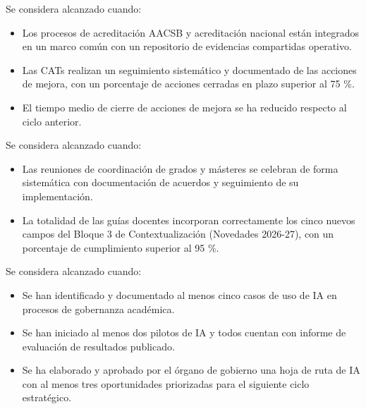 \documentclass[11pt,a4paper]{scrreprt}
\begin{document}
\vspace{6pt}

\begin{tcolorbox}[pabox={gobcolor}{Objetivo 2. Acreditación y aseguramiento de la calidad}]
\small Se considera alcanzado cuando:
\begin{itemize}[noitemsep,topsep=2pt]
\item Los procesos de acreditación AACSB y acreditación nacional están integrados en un marco común con un repositorio de evidencias compartidas operativo.
\item Las CATs realizan un seguimiento sistemático y documentado de las acciones de mejora, con un porcentaje de acciones cerradas en plazo superior al 75 \%.
\item El tiempo medio de cierre de acciones de mejora se ha reducido respecto al ciclo anterior.
\end{itemize}
\end{tcolorbox}

\vspace{6pt}

\begin{tcolorbox}[pabox={gobcolor}{Objetivo 3. Coordinación docente y coherencia curricular}]
\small Se considera alcanzado cuando:
\begin{itemize}[noitemsep,topsep=2pt]
\item Las reuniones de coordinación de grados y másteres se celebran de forma sistemática con documentación de acuerdos y seguimiento de su implementación.
\item La totalidad de las guías docentes incorporan correctamente los cinco nuevos campos del Bloque 3 de Contextualización (Novedades 2026-27), con un porcentaje de cumplimiento superior al 95 \%.
\end{itemize}
\end{tcolorbox}

\vspace{6pt}

\begin{tcolorbox}[pabox={gobcolor}{Objetivo 4. Mejora de la toma de decisiones mediante inteligencia artificial aplicada a la gobernanza académica}]
\small Se considera alcanzado cuando:
\begin{itemize}[noitemsep,topsep=2pt]
\item Se han identificado y documentado al menos cinco casos de uso de IA en procesos de gobernanza académica.
\item Se han iniciado al menos dos pilotos de IA y todos cuentan con informe de evaluación de resultados publicado.
\item Se ha elaborado y aprobado por el órgano de gobierno una hoja de ruta de IA con al menos tres oportunidades priorizadas para el siguiente ciclo estratégico.
\end{itemize}
\end{tcolorbox}
\end{document}
